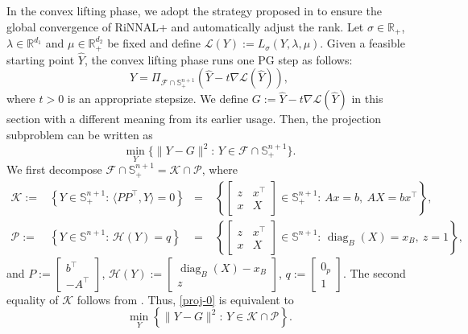 \documentclass[11pt]{article}
\theoremstyle{plain}
\def\H{\mathcal{H}}
\def\<{\big\langle}
\def\>{\big\rangle}
\def\K{\mathcal{K}}
\def\L{\mathcal{L}}
\def\F{\mathcal{F}}
\def\R{\mathbb{R}}
\begin{document}
In the convex lifting phase, we adopt the strategy proposed in \cite{lee2022escaping} to ensure the global convergence of RiNNAL+ and 
automatically adjust the rank. Let $\sigma\in\R_+$, $\lambda\in \R^{d_1}$ and $\mu\in \R^{d_2}_+$ be fixed and define $\L(Y):=L_{\sigma}(Y,\lambda,\mu)$. Given a feasible starting point $\widehat{Y}$, the convex lifting phase runs one PG step as follows:
\begin{equation*}
    Y=\Pi_{\F\cap \mathbb{S}_{+}^{n+1}}(\widehat{Y}-t\nabla \L(\widehat{Y})),
\end{equation*}
where $t>0$ is an appropriate stepsize. We define $G:=\widehat{Y}-t\nabla \L(\widehat{Y})$ in this section with a different meaning from its earlier usage. Then, the projection subproblem can be written as
%
\begin{equation}\label{proj-0}
 \min_Y\Big\{ \|Y-G\|^2:\, Y \in \F\cap \mathbb{S}_{+}^{n+1} \Big\}.
 \end{equation}
We first decompose $\F\cap \mathbb{S}_{+}^{n+1}=\K\cap\mathcal{P}$, where 
\begin{equation*}
\begin{aligned}
\mathcal{K}:=&\left\{Y \in \mathbb{S}_{+}^{n+1}:\, \< PP^\top,Y\>=0\right\}
&=&\; 
\left\{\begin{bmatrix}z& x^\top \\ x & X\end{bmatrix}\in \mathbb{S}_{+}^{n+1}:\, Ax=b,\ AX=bx^\top\right\},
\\
\mathcal{P}:=&\left\{Y\in \mathbb{S}^{n+1}:\,\H(Y)=q\right\}
&=&\;
\left\{\begin{bmatrix}z& x^\top \\ x & X\end{bmatrix}\in \mathbb{S}^{n+1}:\,\operatorname{diag}_B(X)=x_B,\ z=1\right\},
\end{aligned}
\end{equation*}
and $P:=\begin{bmatrix}
b^\top\\-A^\top
\end{bmatrix}$, $\H(Y):=\begin{bmatrix}
\operatorname{diag}_B(X)-x_B\\z
\end{bmatrix}$, $q:=\begin{bmatrix}
0_{p}\\1
\end{bmatrix}$. The second equality of $\K$ follows from \cite[Theorem 1]{bomze2017fresh}.
Thus, \eqref{proj-0} is equivalent to
\begin{equation}\label{proj}
 \min_Y\left\{ \|Y-G\|^2:\, Y \in \K\cap\mathcal{P} \right\}.
 \end{equation}
\end{document}
